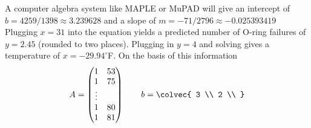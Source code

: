 \begin{ans}{6}
      \begin{exparts}
        \partsitem A computer algebra system like MAPLE or MuPAD will give
          an intercept of $b=4259/1398\approx 3.239628$
          and a slope of $m=-71/2796\approx -0.025393419$
          Plugging $x=31$ into the equation yields a predicted number of
          O-ring failures of $y=2.45$ (rounded to two places).
          Plugging in $y=4$ and solving gives a temperature of
          $x=-29.94^\circ$F.
        \partsitem On the basis of this information
          \begin{equation*}
            A =
            \begin{pmatrix}
               1 & 53 \\
               1 & 75 \\
               \vdots \\
               1 & 80 \\
               1 & 81
            \end{pmatrix}
            \qquad
            b =
            \colvec{ 3 \\
                     2 \\
}
\end{equation*}
\end{exparts}
\end{ans}
